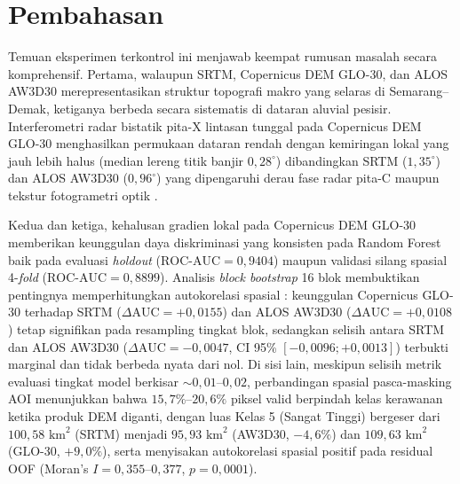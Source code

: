\documentclass[11pt,twoside]{article}
\begin{document}
\FloatBarrier

\section{Pembahasan}\label{sec:pembahasan}

Temuan eksperimen terkontrol ini menjawab keempat rumusan masalah secara komprehensif. Pertama, walaupun SRTM, Copernicus DEM GLO-30, dan ALOS AW3D30 merepresentasikan struktur topografi makro yang selaras di Semarang--Demak, ketiganya berbeda secara sistematis di dataran aluvial pesisir. Interferometri radar bistatik pita-X lintasan tunggal pada Copernicus DEM GLO-30 menghasilkan permukaan dataran rendah dengan kemiringan lokal yang jauh lebih halus (median lereng titik banjir $0{,}28^\circ$) dibandingkan SRTM ($1{,}35^\circ$) dan ALOS AW3D30 ($0{,}96^\circ$) yang dipengaruhi derau fase radar pita-C maupun tekstur fotogrametri optik \cite{farr2007,tadono2016,esa_glo30,meadows2024}.

Kedua dan ketiga, kehalusan gradien lokal pada Copernicus DEM GLO-30 memberikan keunggulan daya diskriminasi yang konsisten pada Random Forest baik pada evaluasi \textit{holdout} ($\text{ROC-AUC} = 0{,}9404$) maupun validasi silang spasial 4-\textit{fold} ($\text{ROC-AUC} = 0{,}8899$). Analisis \textit{block bootstrap} 16 blok membuktikan pentingnya memperhitungkan autokorelasi spasial \cite{roberts2017,ploton2020}: keunggulan Copernicus GLO-30 terhadap SRTM ($\Delta\text{AUC} = +0{,}0155$) dan ALOS AW3D30 ($\Delta\text{AUC} = +0{,}0108$) tetap signifikan pada resampling tingkat blok, sedangkan selisih antara SRTM dan ALOS AW3D30 ($\Delta\text{AUC} = -0{,}0047$, CI 95\% $[-0{,}0096; +0{,}0013]$) terbukti marginal dan tidak berbeda nyata dari nol. Di sisi lain, meskipun selisih metrik evaluasi tingkat model berkisar $\sim 0{,}01\text{--}0{,}02$, perbandingan spasial pasca-masking AOI menunjukkan bahwa $15{,}7\%\text{--}20{,}6\%$ piksel valid berpindah kelas kerawanan ketika produk DEM diganti, dengan luas Kelas 5 (Sangat Tinggi) bergeser dari $100{,}58\text{ km}^2$ (SRTM) menjadi $95{,}93\text{ km}^2$ (AW3D30, $-4{,}6\%$) dan $109{,}63\text{ km}^2$ (GLO-30, $+9{,}0\%$), serta menyisakan autokorelasi spasial positif pada residual OOF (Moran's $I = 0{,}355\text{--}0{,}377$, $p = 0{,}0001$).
\end{document}

